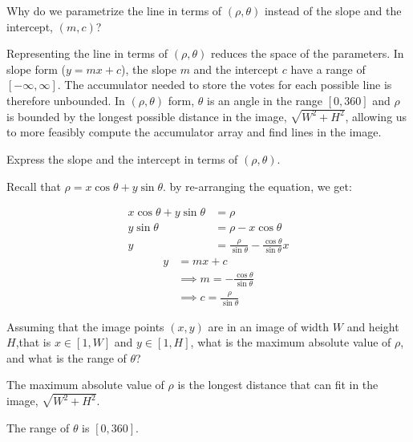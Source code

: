 \newpage
\begin{problem}
  \begin{enumroman}
  \item Why do we parametrize the line in terms of $(\rho, \theta)$
  instead of the slope and the intercept, $(m, c)$?
  \begin{Answer}
    Representing the line in terms of $(\rho, \theta)$
    reduces the space of the parameters.
    In slope form ($y = mx + c$), the slope $m$ and the intercept $c$
    have a range of $[-\infty, \infty]$.
    The accumulator needed to store the votes for each possible
    line is therefore unbounded.
    In $(\rho, \theta)$ form, $\theta$ is an angle in the range
    $[0, 360]$ and $\rho$ is bounded by the longest possible distance
    in the image, $\sqrt{W^2 + H^2}$, allowing us to more feasibly
    compute the accumulator array and find lines in the image.
  \end{Answer}

  \item Express the slope and the intercept in terms of $(\rho, \theta)$.
  \begin{Answer}
    Recall that $\rho = x \cos \theta + y \sin \theta$.
    by re-arranging the equation, we get:
    \begin{multicols}{2}
      \noindent
      \begin{align*}
        x \cos \theta + y \sin \theta &= \rho \\
        y \sin \theta &= \rho - x \cos \theta \\
        y &= \frac{\rho}{\sin \theta} - \frac{\cos \theta}{\sin \theta}x
      \end{align*}
      \begin{align*}
        y &= mx + c \\
        &\implies m = - \frac{\cos \theta}{\sin \theta} \\
        &\implies c = \frac{\rho}{\sin \theta}
      \end{align*}
    \end{multicols}
  \end{Answer}
  \end{enumroman}
\end{problem}

\begin{problem}
  Assuming that the image points $(x, y)$ are in an image
  of width $W$ and height $H$,that is $x \in [1, W]$ and $y \in [1, H]$,
  what is the maximum absolute value of $\rho$,
  and what is the range of $\theta$?
  \begin{Answer}
    The maximum absolute value of $\rho$ is the longest distance
    that can fit in the image, $\sqrt{W^2 + H^2}$.

    \step
    The range of $\theta$ is $[0, 360]$.
  \end{Answer}
\end{problem}

